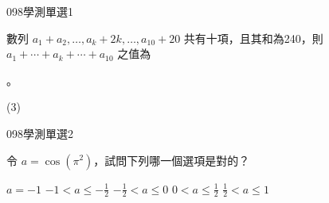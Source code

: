 \begin{QUESTIONS}
    \begin{QUESTION}
        \begin{ExamInfo}{098}{學測}{單選}{1}
        \end{ExamInfo}
        \begin{ExamAnsRateInfo}{85}{99}{95}{61}
        \end{ExamAnsRateInfo}
        \begin{QBODY}
			數列 $a_1 + a_2, \dots ,a_k +2k , \dots , a_{10} +20$ 共有十項，且其和為240，則 $a_1 + \cdots +a_k + \cdots +a_{10}$ 之值為 
			\begin{QOPS} 
				 。
			\end{QOPS}
        \end{QBODY}
        \begin{QFROMS}
        \end{QFROMS}
        \begin{QTAGS}\end{QTAGS}
        \begin{QANS}
            (3)
        \end{QANS}
        \begin{QSOLLIST}
        \end{QSOLLIST}
        \begin{QEMPTYSPACE}
        \end{QEMPTYSPACE}
    \end{QUESTION}
    \begin{QUESTION}
        \begin{ExamInfo}{098}{學測}{單選}{2}
        \end{ExamInfo}
        \begin{ExamAnsRateInfo}{23}{36}{18}{15}
        \end{ExamAnsRateInfo}
        \begin{QBODY}
			令 $a = \cos (\pi^2 )$，試問下列哪一個選項是對的？
			\begin{QOPS} 
				\QOP $a= -1$
				\QOP $-1< a \leq -\frac{1}{2}$
				\QOP $-\frac{1}{2} < a \leq 0$ 
				\QOP $0 < a \leq \frac{1}{2}$ 
				\QOP $\frac{1}{2} < a \leq 1 $
			\end{QOPS}
        \end{QBODY}
        \begin{QFROMS}
        \end{QFROMS}
        \begin{QTAGS}\end{QTAGS}

\end{QUESTION}
\end{QUESTIONS}
